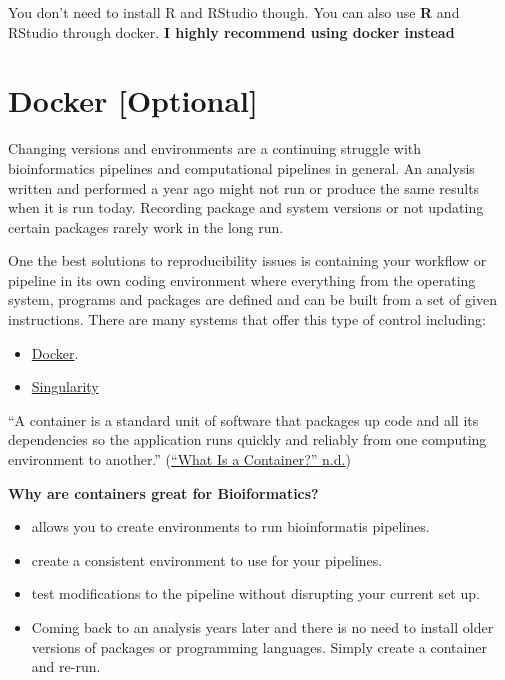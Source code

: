 \documentclass[
]{book}
\providecommand{\tightlist}{%
  \setlength{\itemsep}{0pt}\setlength{\parskip}{0pt}}
\begin{document}
You don't need to install R and RStudio though. You can also use \textbf{R} and RStudio through docker. \textbf{I highly recommend using docker instead}

\hypertarget{docker-optional}{%
\section{Docker {[}Optional{]}}\label{docker-optional}}

Changing versions and environments are a continuing struggle with bioinformatics pipelines and computational pipelines in general. An analysis written and performed a year ago might not run or produce the same results when it is run today. Recording package and system versions or not updating certain packages rarely work in the long run.

One the best solutions to reproducibility issues is containing your workflow or pipeline in its own coding environment where everything from the operating system, programs and packages are defined and can be built from a set of given instructions. There are many systems that offer this type of control including:

\begin{itemize}
\tightlist
\item
  \href{https://www.docker.com/}{Docker}.
\item
  \href{https://sylabs.io/}{Singularity}
\end{itemize}

``A container is a standard unit of software that packages up code and all its dependencies so the application runs quickly and reliably from one computing environment to another.'' (\protect\hyperlink{ref-docker}{{``What Is a Container?''} n.d.})

\textbf{Why are containers great for Bioiformatics?}

\begin{itemize}
\tightlist
\item
  allows you to create environments to run bioinformatis pipelines.
\item
  create a consistent environment to use for your pipelines.
\item
  test modifications to the pipeline without disrupting your current set up.
\item
  Coming back to an analysis years later and there is no need to install older versions of packages or programming languages. Simply create a container and re-run.
\end{itemize}
\end{document}
